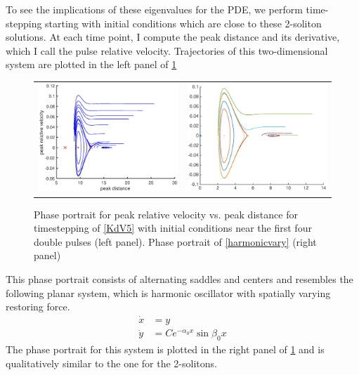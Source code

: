 \documentclass[12pt,reqno]{amsart}
\theoremstyle{definition}
\theoremstyle{remark}
\begin{document}
To see the implications of these eigenvalues for the PDE, we 
perform time-stepping starting with initial conditions which are close to these 2-soliton solutions. At each time point, I  compute the peak distance and its derivative, which I call the pulse relative velocity. Trajectories of this two-dimensional system are plotted in the left panel of \cref{fig:KdV5timestep}
\begin{figure}[ht]
\begin{center}
\begin{tabular}{cc}
\includegraphics[width=8cm]{phaseportrait} &
\includegraphics[width=8cm]{simplephaseportrait} \\
\end{tabular}
\caption{Phase portrait for peak relative velocity vs. peak distance for timestepping of \cref{KdV5} with initial conditions near the first four double pulses (left panel). Phase portrait of \cref{harmonicvary} (right panel)
}
\label{fig:KdV5timestep}
\end{center}
\end{figure}
This phase portrait consists of alternating saddles and centers and resembles the following planar system, which is harmonic oscillator with spatially varying restoring force.
\begin{equation}\label{harmonicvary}
\begin{aligned}
\dot{x} &= y \\
\dot{y} &= C e^{-\alpha_0 x} \sin \beta_0 x
\end{aligned}
\end{equation}
The phase portrait for this system is plotted in the right panel of \cref{fig:KdV5timestep} and is qualitatively similar to the one for the 2-solitons.
\end{document}
